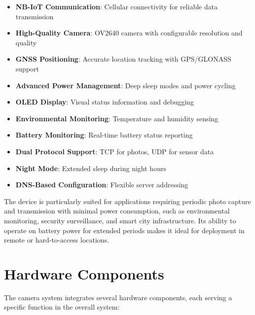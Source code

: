 \documentclass[11pt,a4paper]{article}
\begin{document}
\begin{infobox}[title=Key Features]
\begin{itemize}[leftmargin=*]
    \item \textbf{NB-IoT Communication}: Cellular connectivity for reliable data transmission
    \item \textbf{High-Quality Camera}: OV2640 camera with configurable resolution and quality
    \item \textbf{GNSS Positioning}: Accurate location tracking with GPS/GLONASS support
    \item \textbf{Advanced Power Management}: Deep sleep modes and power cycling
    \item \textbf{OLED Display}: Visual status information and debugging
    \item \textbf{Environmental Monitoring}: Temperature and humidity sensing
    \item \textbf{Battery Monitoring}: Real-time battery status reporting
    \item \textbf{Dual Protocol Support}: TCP for photos, UDP for sensor data
    \item \textbf{Night Mode}: Extended sleep during night hours
    \item \textbf{DNS-Based Configuration}: Flexible server addressing
\end{itemize}
\end{infobox}

The device is particularly suited for applications requiring periodic photo capture and transmission with minimal power consumption, such as environmental monitoring, security surveillance, and smart city infrastructure. Its ability to operate on battery power for extended periods makes it ideal for deployment in remote or hard-to-access locations.

\section{Hardware Components}

The camera system integrates several hardware components, each serving a specific function in the overall system:
\end{document}

